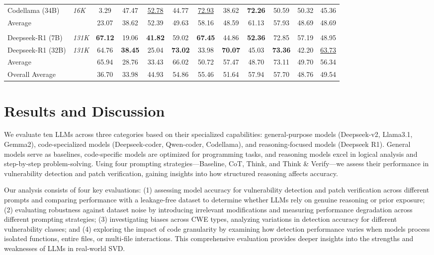 \documentclass[sigconf]{acmart}
\begin{document}
\begin{table}[h!]
{\begin{tabular}{ll|cc|cc|cc|cc|cc}
  Codellama (34B) & \textit{16K} & 3.29 & 47.47 & \underline{52.78} & 44.77 & \underline{72.93} & 38.62 & \textbf{72.26} & 50.59 & 50.32 & 45.36 \\
  \rowcolor{gray!15} Average & & 23.07 & 38.62 & 52.39 & 49.63 & 58.16 & 48.59 & 61.13 & 57.93 & 48.69 & 48.69 \\
  \midrule
  \rowcolor{blue!15} \multicolumn{12}{c}{Reasoning Models} \\ 
  Deepseek-R1 (7B) & \textit{131K} & \textbf{67.12} & 19.06 & \textbf{41.82} & 59.02 & \textbf{67.45} & 44.86 & \textbf{52.36} & 72.85 & 57.19 & 48.95 \\
  Deepseek-R1 (32B) & \textit{131K} & 64.76 & \textbf{38.45} & 25.04 & \textbf{73.02} & 33.98 & \textbf{70.07} & 45.03 & \textbf{73.36} & 42.20 & \underline{63.73} \\
  \rowcolor{gray!15} Average & & 65.94 & 28.76 & 33.43 & 66.02 & 50.72 & 57.47 & 48.70 & 73.11 & 49.70 & 56.34 \\
  \midrule
  \rowcolor{gray!15} Overall Average & & 36.70 & 33.98 & 44.93 & 54.86 & 55.46 & 51.64 & 57.94 & 57.70 & 48.76 & 49.54 \\
  \bottomrule
  \end{tabular}
  } %
\end{table}


\section{Results and Discussion}
\label{section:result}

We evaluate ten LLMs across three categories based on their specialized capabilities: general-purpose models (Deepseek-v2, Llama3.1, Gemma2), code-specialized models (Deepseek-coder, Qwen-coder, Codellama), and reasoning-focused models (Deepseek R1). General models serve as baselines, code-specific models are optimized for programming tasks, and reasoning models excel in logical analysis and step-by-step problem-solving. Using four prompting strategies—Baseline, CoT, Think, and Think \& Verify—we assess their performance in vulnerability detection and patch verification, gaining insights into how structured reasoning affects accuracy.

Our analysis consists of four key evaluations: (1) assessing model accuracy for vulnerability detection and patch verification across different prompts and comparing performance with a leakage-free dataset to determine whether LLMs rely on genuine reasoning or prior exposure; (2) evaluating robustness against dataset noise by introducing irrelevant modifications and measuring performance degradation across different prompting strategies; (3) investigating biases across CWE types, analyzing variations in detection accuracy for different vulnerability classes; and (4) exploring the impact of code granularity by examining how detection performance varies when models process isolated functions, entire files, or multi-file interactions. This comprehensive evaluation provides deeper insights into the strengths and weaknesses of LLMs in real-world SVD.
\end{document}
